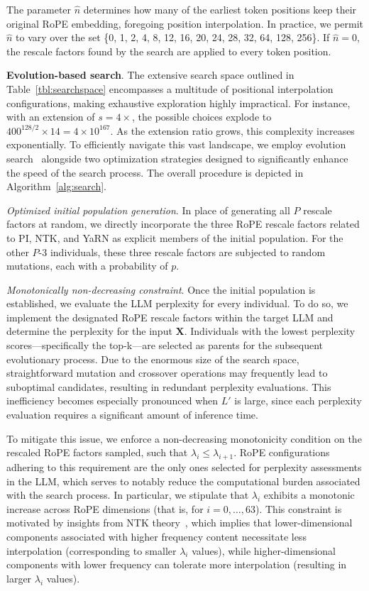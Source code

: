 The parameter $\hat{n}$ determines how many of the earliest token positions keep their original RoPE embedding, foregoing position interpolation. In practice, we permit $\hat{n}$ to vary over the set \{0, 1, 2, 4, 8, 12, 16, 20, 24, 28, 32, 64, 128, 256\}. If $\hat{n}=0$, the rescale factors found by the search are applied to every token position.

\textbf{Evolution-based search}. The extensive search space outlined in Table~\ref{tbl:searchspace} encompasses a multitude of positional interpolation configurations, making exhaustive exploration highly impractical. For instance, with an extension of $s=4\times$, the possible choices explode to $400^{128/2}\times14=4\times10^{167}$. As the extension ratio grows, this complexity increases exponentially. To efficiently navigate this vast landscape, we employ evolution search~\cite{guo2020single} alongside two optimization strategies designed to significantly enhance the speed of the search process. The overall procedure is depicted in Algorithm~\ref{alg:search}.

\textit{Optimized initial population generation}. In place of generating all $P$ rescale factors at random, we directly incorporate the three RoPE rescale factors related to PI, NTK, and YaRN as explicit members of the initial population. For the other $P$-3 individuals, these three rescale factors are subjected to random mutations, each with a probability of $p$.

\textit{Monotonically non-decreasing constraint}. Once the initial population is established, we evaluate the LLM perplexity for every individual. To do so, we implement the designated RoPE rescale factors within the target LLM and determine the perplexity for the input $\mathbf{X}$. Individuals with the lowest perplexity scores—specifically the top-k—are selected as parents for the subsequent evolutionary process. Due to the enormous size of the search space, straightforward mutation and crossover operations may frequently lead to suboptimal candidates, resulting in redundant perplexity evaluations. This inefficiency becomes especially pronounced when $L'$ is large, since each perplexity evaluation requires a significant amount of inference time.

To mitigate this issue, we enforce a non-decreasing monotonicity condition on the rescaled RoPE factors sampled, such that $\lambda_i \le \lambda_{i+1}$. RoPE configurations adhering to this requirement are the only ones selected for perplexity assessments in the LLM, which serves to notably reduce the computational burden associated with the search process. In particular, we stipulate that $\lambda_i$ exhibits a monotonic increase across RoPE dimensions (that is, for $i = 0,\ldots,63$). This constraint is motivated by insights from NTK theory~\cite{jacot2018neural,tancik2020fourier,ntk}, which implies that lower-dimensional components associated with higher frequency content necessitate less interpolation (corresponding to smaller $\lambda_i$ values), while higher-dimensional components with lower frequency can tolerate more interpolation (resulting in larger $\lambda_i$ values).

